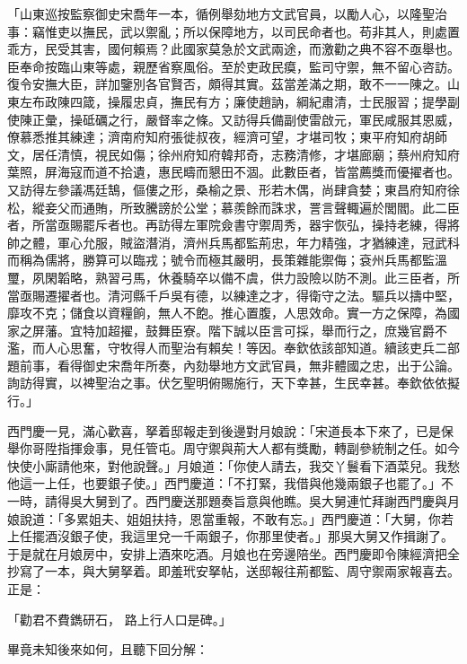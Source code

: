 \begin{showcontents}{}
「山東巡按監察御史宋喬年一本，循例舉劾地方文武官員，以勵人心，以隆聖治事：竊惟吏以撫民，武以禦亂；所以保障地方，以司民命者也。苟非其人，則處置乖方，民受其害，國何賴焉？此國家莫急於文武兩途，而激勸之典不容不亟舉也。臣奉命按臨山東等處，親歷省察風俗。至於吏政民瘼，監司守禦，無不留心咨訪。復令安撫大臣，詳加鑒別各官賢否，頗得其實。茲當差滿之期，敢不一一陳之。山東左布政陳四箴，操履忠貞，撫民有方；廉使趙訥，綱紀肅清，士民服習；提學副使陳正彙，操砥礪之行，嚴督率之條。又訪得兵備副使雷啟元，軍民咸服其恩威，僚慕悉推其練達；濟南府知府張徙叔夜，經濟可望，才堪司牧；東平府知府胡師文，居任清慎，視民如傷；徐州府知府韓邦奇，志務清修，才堪廊廟；蔡州府知府葉照，屏海寇而道不拾遺，惠民疇而懇田不涸。此數臣者，皆當薦獎而優擢者也。又訪得左參議馮廷鵠，傴僂之形，桑榆之景、形若木偶，尚肆貪婪；東昌府知府徐松，縱妾父而通賄，所致騰謗於公堂；慕羨餘而誅求，詈言聲輙遍於閭閻。此二臣者，所當亟賜罷斥者也。再訪得左軍院僉書守禦周秀，器宇恢弘，操持老練，得將帥之體，軍心允服，賊盜潛消，濟州兵馬都監荊忠，年力精強，才猶練達，冠武科而稱為儒將，勝算可以臨戎；號令而極其嚴明，長策雜能禦侮；袞州兵馬都監溫璽，夙閑韜略，熟習弓馬，休養騎卒以備不虞，供力設險以防不測。此三臣者，所當亟賜遷擢者也。清河縣千戶吳有德，以練達之才，得衛守之法。驅兵以擣中堅，靡攻不克；儲食以資糧餉，無人不飽。推心置腹，人思效命。實一方之保障，為國家之屏藩。宜特加超擢，鼓舞臣寮。階下誠以臣言可採，舉而行之，庶幾官爵不濫，而人心思奮，守牧得人而聖治有賴矣！等因。奉欽依該部知道。續該吏兵二部題前事，看得御史宋喬年所奏，內劾舉地方文武官員，無非體國之忠，出于公論。詢訪得實，以裨聖治之事。伏乞聖明俯賜施行，天下幸甚，生民幸甚。奉欽依依擬行。」

西門慶一見，滿心歡喜，拏着邸報走到後邊對月娘說：「宋道長本下來了，已是保舉你哥陞指揮僉事，見任管屯。周守禦與荊大人都有獎勵，轉副參統制之任。如今快使小廝請他來，對他說聲。」月娘道：「你使人請去，我交丫鬟看下酒菜兒。我愁他這一上任，也要銀子使。」西門慶道：「不打緊，我借與他幾兩銀子也罷了。」不一時，請得吳大舅到了。西門慶送那題奏旨意與他瞧。吳大舅連忙拜謝西門慶與月娘說道：「多累姐夫、姐姐扶持，恩當重報，不敢有忘。」西門慶道：「大舅，你若上任擺酒沒銀子使，我這里兌一千兩銀子，你那里使者。」那吳大舅又作揖謝了。于是就在月娘房中，安排上酒來吃酒。月娘也在旁邊陪坐。西門慶即令陳經濟把全抄寫了一本，與大舅拏着。即羞玳安拏帖，送邸報往荊都監、周守禦兩家報喜去。正是：

「勸君不費鐫研石，  路上行人口是碑。」

畢竟未知後來如何，且聽下回分解：





\end{showcontents}


